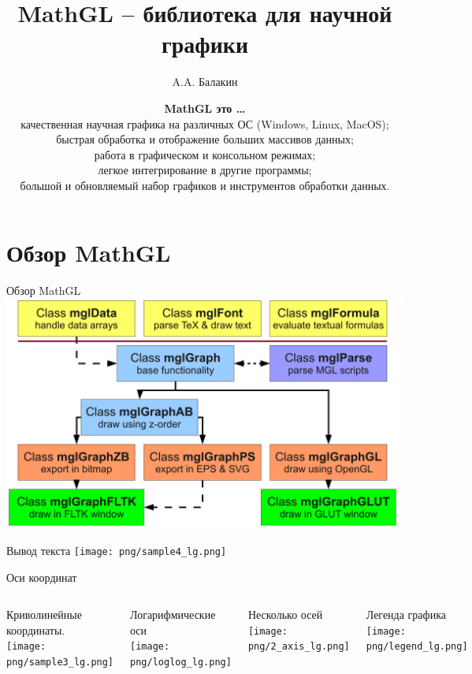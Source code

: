 \documentclass[color=usenames]{beamer}
\begin{document}
\title{MathGL -- библиотека для научной графики}

\author{A.A. Балакин}

\date{\flushleft
\textbf{MathGL это \ldots}\\
качественная научная графика на различных ОС (Windows, Linux, MacOS);\\
быстрая обработка и отображение больших массивов данных;\\
работа в графическом и консольном режимах;\\
легкое интегрирование в другие программы;\\
большой и обновляемый набор графиков и инструментов обработки данных.
}

\begin{frame}
\titlepage
\end{frame}

\section{Обзор MathGL}

\begin{frame}{Обзор MathGL}
\includegraphics[width = \textwidth]{classes}
\end{frame}

\begin{frame}{Вывод текста}
\texttt{[image: png/sample4\_lg.png]}
\end{frame}

\begin{frame}{Оси координат}
\begin{columns}
Криволинейные координаты.\\
\texttt{[image: png/sample3\_lg.png]}

Логарифмические оси\\
\texttt{[image: png/loglog\_lg.png]}

Несколько осей\\
\texttt{[image: png/2\_axis\_lg.png]}

Легенда графика\\
\texttt{[image: png/legend\_lg.png]}

\end{columns}
\end{frame}
\end{document}
